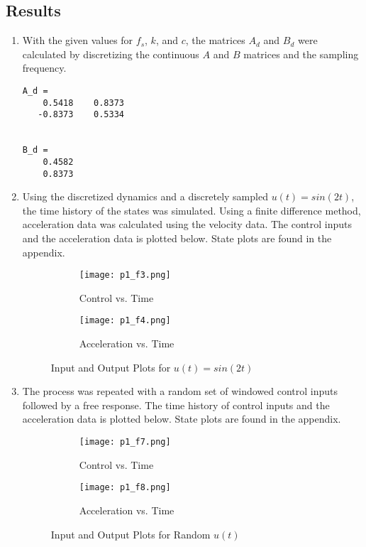 \documentclass{article}
\begin{document}
\subsection{Results}
\begin{enumerate}
    \item With the given values for $f_s$, $k$, and $c$, the matrices $A_d$ and $B_d$ were calculated by discretizing the continuous $A$ and $B$ matrices and the sampling frequency.
    \begin{lstlisting}[style=Matlab-editor]
A_d =
    0.5418    0.8373
   -0.8373    0.5334


B_d =
    0.4582
    0.8373
    \end{lstlisting}

    \item Using the discretized dynamics and a discretely sampled $u(t)=sin(2t)$, the time history of the states was simulated. Using a finite difference method, acceleration data was calculated using the velocity data. The control inputs and the acceleration data is plotted below. State plots are found in the appendix. 

    \begin{figure}[h]
    \centering
    \begin{subfigure}{.5\textwidth}
      \centering
      \texttt{[image: p1\_f3.png]}
      \caption{Control vs. Time}
      \label{fig:sub1}
    \end{subfigure}%
    \begin{subfigure}{.5\textwidth}
      \centering
      \texttt{[image: p1\_f4.png]}
      \caption{Acceleration vs. Time}
      \label{fig:sub2}
    \end{subfigure}
    \caption{Input and Output Plots for $u(t)=sin(2t)$}
    \label{fig:test}
    \end{figure}
    
    \item The process was repeated with a random set of windowed control inputs followed by a free response. The time history of control inputs and the acceleration data is plotted below. State plots are found in the appendix.
    
    \begin{figure}[h]
    \centering
    \begin{subfigure}{.5\textwidth}
      \centering
      \texttt{[image: p1\_f7.png]}
      \caption{Control vs. Time}
      \label{fig:sub1}
    \end{subfigure}%
    \begin{subfigure}{.5\textwidth}
      \centering
      \texttt{[image: p1\_f8.png]}
      \caption{Acceleration vs. Time}
      \label{fig:sub2}
    \end{subfigure}
    \caption{Input and Output Plots for Random $u(t)$}
    \label{fig:test}
    \end{figure}


\end{enumerate}
\end{document}
